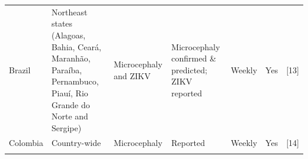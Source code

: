 \documentclass[10pt,letterpaper]{article}
\begin{document}
\begin{longtable}[]{@{}lllllll@{}}
\begin{minipage}[t]{0.03\columnwidth}\raggedright\strut
Brazil\strut
\end{minipage} & \begin{minipage}[t]{0.37\columnwidth}\raggedright\strut
Northeast states (Alagoas, Bahia, Ceará, Maranhão, Paraíba, Pernambuco,
Piauí, Rio Grande do Norte and Sergipe)\strut
\end{minipage} & \begin{minipage}[t]{0.08\columnwidth}\raggedright\strut
Microcephaly and ZIKV\strut
\end{minipage} & \begin{minipage}[t]{0.17\columnwidth}\raggedright\strut
Microcephaly confirmed \& predicted; ZIKV reported\strut
\end{minipage} & \begin{minipage}[t]{0.04\columnwidth}\raggedright\strut
Weekly\strut
\end{minipage} & \begin{minipage}[t]{0.04\columnwidth}\raggedright\strut
Yes\strut
\end{minipage} & \begin{minipage}[t]{0.08\columnwidth}\raggedright\strut
{[}13{]}\strut
\end{minipage}\tabularnewline
\begin{minipage}[t]{0.03\columnwidth}\raggedright\strut
Colombia\strut
\end{minipage} & \begin{minipage}[t]{0.37\columnwidth}\raggedright\strut
Country-wide\strut
\end{minipage} & \begin{minipage}[t]{0.08\columnwidth}\raggedright\strut
Microcephaly\strut
\end{minipage} & \begin{minipage}[t]{0.17\columnwidth}\raggedright\strut
Reported\strut
\end{minipage} & \begin{minipage}[t]{0.04\columnwidth}\raggedright\strut
Weekly\strut
\end{minipage} & \begin{minipage}[t]{0.04\columnwidth}\raggedright\strut
Yes\strut
\end{minipage} & \begin{minipage}[t]{0.08\columnwidth}\raggedright\strut
{[}14{]}\strut
\end{minipage}\tabularnewline
\begin{minipage}[t]{0.03\columnwidth}\raggedright\strut

\end{minipage}
\end{longtable}
\end{document}
